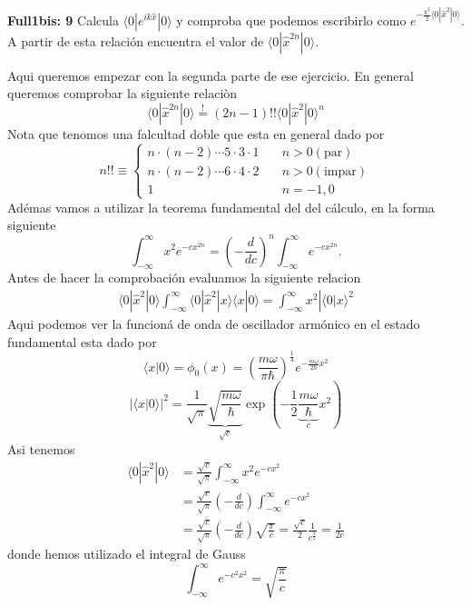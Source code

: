 \begin{ejercicio}
\textbf{Full1bis: 9}
	Calcula $\langle 0 | e^{ik\hat x} | 0 \rangle$ y comproba que podemos
escribirlo como $e^{-\frac{k^2}{2} \langle 0 | \hat x^2 | 0 \rangle}$. A partir
de esta relación encuentra el valor de $\langle 0 | \hat x^{2n} | 0 \rangle$.
\end{ejercicio}
Aqui queremos empezar con la segunda parte de ese ejercicio. En general queremos
comprobar la siguiente relaciòn
$$
	\langle 0 | \hat x^{2n} | 0 \rangle \overset{!}{=} (2n - 1)!! \langle 0 |
\hat x^2 | 0 \rangle^n 
$$
Nota que tenomos una falcultad doble que esta en general dado por
$$
	n!! \equiv 
	\left\{
	\begin{split}
		n \cdot (n-2) \cdots 5 \cdot 3 \cdot 1 \quad &n > 0 (\text{par}) \\
		n \cdot (n-2) \cdots 6 \cdot 4 \cdot 2 \quad &n > 0 (\text{impar}) \\
		1  & n = -1, 0
	\end{split}
	\right.
$$
Adémas vamos a utilizar la teorema fundamental del del cálculo, en la forma
siguiente
$$
	\int_{-\infty}^\infty x^2  e^{-c x^{2n}} = \left(- \frac{d}{d c}\right)^n
\int_{-\infty}^\infty e^{-c x^{2n}}.
$$
Antes de hacer la comprobación evaluamos la siguiente relacion
\begin{align*}
	\langle 0 | \hat  x^2 | 0 \rangle \int_{-\infty}^\infty \langle 0 | \hat x^2 | x
\rangle \langle x | 0 \rangle = \int_{-\infty}^\infty x^2 | \langle 0 | x
\rangle^2
\end{align*}
Aqui podemos ver la funcioná de onda de oscillador armónico en el estado
fundamental esta dado por
$$
	\langle x | 0 \rangle = \phi_0 (x) = \left(\frac{m \omega}{\pi \hbar}
\right)^\frac{1}{4} e^{-\frac{m\omega}{2\hbar} x^2}  
$$
$$
	|\langle x | 0 \rangle |^2 = \frac{1}{\sqrt \pi} \underbrace{\sqrt{
\frac{m\omega}{\hbar}}}_{\sqrt{c}}
\exp\left(-\frac{1}{2}\underbrace{\frac{m\omega}{\hbar}}_{c} x^2\right)
$$
Asi tenemos
\begin{align*}
	\langle 0 | \hat x^2 | 0 \rangle &= \frac{\sqrt c}{\sqrt{\pi}} 
\int_{-\infty}^\infty x^2 e^{-c x^2} \\
&= \frac{\sqrt c}{\sqrt \pi} \left(-
\frac{d}{dc} \right) \int_{-\infty}^\infty e^{-cx^2} \\
&= \frac{\sqrt c}{\sqrt \pi} \left(-\frac{d}{dc}\right) \sqrt{\frac{\pi}{c}} = \frac{\sqrt c}{2} \frac{1}{ c^{\frac{3}{2}}} =
\frac{1}{2c}
\end{align*}
donde hemos utilizado el integral de Gauss
$$
	\int_{-\infty}^\infty e^{-c^2 x^2} = \sqrt{\frac{\pi}{c}}
$$
